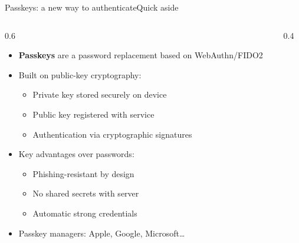 \ifdefined\PRESENTATION\else\PassOptionsToClass{handout}{beamer}\fi\documentclass[aspectratio=169, lualatex]{beamer}
\begin{document}
\begin{frame}{Passkeys: a new way to authenticate}{Quick aside}
	\begin{columns}[c]
		\begin{column}{0.6\textwidth}
			\begin{itemize}
				\item \textbf{Passkeys} are a password replacement based on WebAuthn/FIDO2
				\item Built on public-key cryptography:
				      \begin{itemize}
					      \item Private key stored securely on device
					      \item Public key registered with service
					      \item Authentication via cryptographic signatures
				      \end{itemize}
				\item Key advantages over passwords:
				      \begin{itemize}
					      \item Phishing-resistant by design
					      \item No shared secrets with server
					      \item Automatic strong credentials
				      \end{itemize}
				\item Passkey managers: Apple, Google, Microsoft\ldots
			\end{itemize}
		\end{column}
		\begin{column}{0.4\textwidth}
		\end{column}
	\end{columns}
\end{frame}
\end{document}
